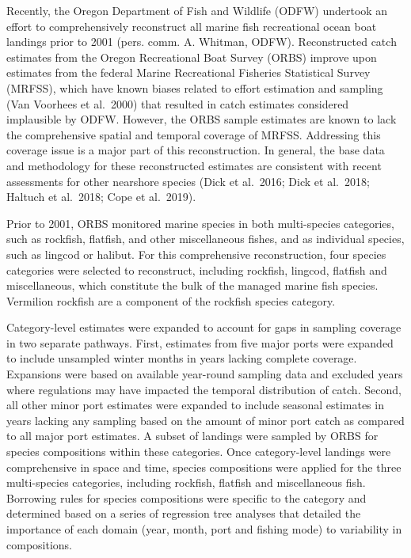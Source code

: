 \documentclass[11pt,
  english,
  a4paper,
]{article}
\begin{document}
\leavevmode\tagmcend\tagstructend


Recently, the Oregon Department of Fish and Wildlife (ODFW) undertook an effort to comprehensively reconstruct all marine fish recreational ocean boat landings prior to 2001 (pers. comm. A. Whitman, ODFW). Reconstructed catch estimates from the Oregon Recreational Boat Survey (ORBS) improve upon estimates from the federal Marine Recreational Fisheries Statistical Survey (MRFSS), which have known biases related to effort estimation and sampling (Van Voorhees et al.~2000) that resulted in catch estimates considered implausible by ODFW. However, the ORBS sample estimates are known to lack the comprehensive spatial and temporal coverage of MRFSS. Addressing this coverage issue is a major part of this reconstruction. In general, the base data and methodology for these reconstructed estimates are consistent with recent assessments for other nearshore species (Dick et al.~2016; Dick et al.~2018; Haltuch et al.~2018; Cope et al.~2019).

\leavevmode\tagmcend\tagstructend\par


Prior to 2001, ORBS monitored marine species in both multi-species categories, such as rockfish, flatfish, and other miscellaneous fishes, and as individual species, such as lingcod or halibut. For this comprehensive reconstruction, four species categories were selected to reconstruct, including rockfish, lingcod, flatfish and miscellaneous, which constitute the bulk of the managed marine fish species. Vermilion rockfish are a component of the rockfish species category.

\leavevmode\tagmcend\tagstructend\par


Category-level estimates were expanded to account for gaps in sampling coverage in two separate pathways. First, estimates from five major ports were expanded to include unsampled winter months in years lacking complete coverage. Expansions were based on available year-round sampling data and excluded years where regulations may have impacted the temporal distribution of catch. Second, all other minor port estimates were expanded to include seasonal estimates in years lacking any sampling based on the amount of minor port catch as compared to all major port estimates. A subset of landings were sampled by ORBS for species compositions within these categories. Once category-level landings were comprehensive in space and time, species compositions were applied for the three multi-species categories, including rockfish, flatfish and miscellaneous fish. Borrowing rules for species compositions were specific to the category and determined based on a series of regression tree analyses that detailed the importance of each domain (year, month, port and fishing mode) to variability in compositions.
\end{document}
